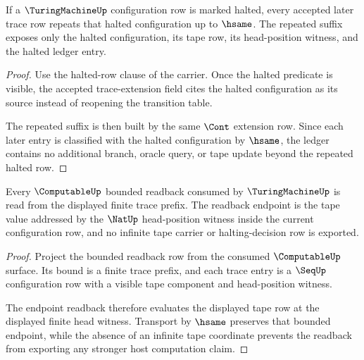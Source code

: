 \begin{theorem}
\label{thm:turingmachine-halted-repeat-obligation}
If a $\TuringMachineUp$ configuration row is marked halted, every accepted
later trace row repeats that halted configuration up to $\hsame$. The repeated
suffix exposes only the halted configuration, its tape row, its head-position
witness, and the halted ledger entry.
\end{theorem}
\begin{proof}
Use the halted-row clause of the carrier. Once the halted predicate is visible,
the accepted trace-extension field cites the halted configuration as its source
instead of reopening the transition table.

The repeated suffix is then built by the same $\Cont$ extension row. Since each
later entry is classified with the halted configuration by $\hsame$, the ledger
contains no additional branch, oracle query, or tape update beyond the repeated
halted row.
\end{proof}

\begin{theorem}
\label{thm:turingmachine-bounded-readback-soundness}
Every $\ComputableUp$ bounded readback consumed by $\TuringMachineUp$ is read
from the displayed finite trace prefix. The readback endpoint is the tape value
addressed by the $\NatUp$ head-position witness inside the current
configuration row, and no infinite tape carrier or halting-decision row is
exported.
\end{theorem}
\begin{proof}
Project the bounded readback row from the consumed $\ComputableUp$ surface. Its
bound is a finite trace prefix, and each trace entry is a $\SeqUp$
configuration row with a visible tape component and head-position witness.

The endpoint readback therefore evaluates the displayed tape row at the
displayed finite head witness. Transport by $\hsame$ preserves that bounded
endpoint, while the absence of an infinite tape coordinate prevents the
readback from exporting any stronger host computation claim.
\end{proof}

